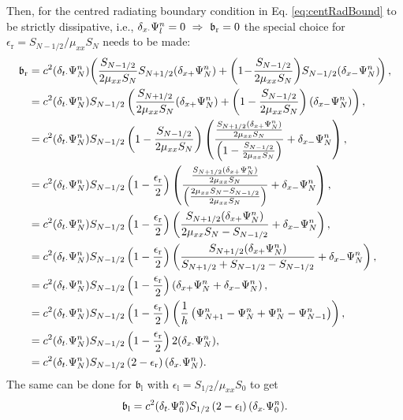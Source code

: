 Then, for the centred radiating boundary condition in Eq. \eqref{eq:centRadBound} to be strictly dissipative, i.e., $\dxd \Psiln = 0 \ \Rightarrow \ \b_\text{r} = 0$ the special choice for $\epsilon_\text{r} = S_{N-1/2} / \mu_{xx}S_N$ needs to be made:
\begin{equation}
    \begin{aligned}
        \mathfrak{b}_\text{r} &= c^2 (\delta_{t\cdot}\Psi_N^n)\!\left(\frac{S_{N-1/2}}{2\mu_{xx}S_N}S_{N+1/2}(\delta_{x+}\Psi_N^n)+\left(1\!-\!\frac{S_{N-1/2}}{2\mu_{xx}S_N}\right)\!S_{N-1/2}(\delta_{x-}\Psi_N^n)\!\right),\\
        &= c^2 (\delta_{t\cdot}\Psi_N^n)S_{N-1/2}\left(\frac{S_{N+1/2}}{2\mu_{xx}S_N}(\delta_{x+}\Psi_N^n)+\left(1-\frac{S_{N-1/2}}{2\mu_{xx}S_N}\right)(\delta_{x-}\Psi_N^n)\right),\\
        &=c^2 (\delta_{t\cdot}\Psi_N^n)S_{N-1/2}\left(1-\frac{S_{N-1/2}}{2\mu_{xx}S_N}\right)\left(\frac{\frac{S_{N+1/2}(\delta_{x+}\Psi_N^n)}{2\mu_{xx}S_N}}{\left(1-\frac{S_{N-1/2}}{2\mu_{xx}S_N}\right)}+\delta_{x-}\Psi_N^n\right),\\
        &=c^2 (\delta_{t\cdot}\Psi_N^n)S_{N-1/2}\left(1-\frac{\epsilon_\text{r}}{2}\right)\left(\frac{\frac{S_{N+1/2}(\delta_{x+}\Psi_N^n)}{2\mu_{xx}S_N}}{\left(\frac{2\mu_{xx}S_N - S_{N-1/2}}{2\mu_{xx}S_N}\right)}+\delta_{x-}\Psi_N^n\right),\\
        &=c^2 (\delta_{t\cdot}\Psi_N^n)S_{N-1/2}\left(1-\frac{\epsilon_\text{r}}{2}\right)\left(\frac{S_{N+1/2}(\delta_{x+}\Psi_N^n)}{2\mu_{xx}S_N - S_{N-1/2}}+\delta_{x-}\Psi_N^n\right),\\
        &=c^2 (\delta_{t\cdot}\Psi_N^n)S_{N-1/2}\left(1-\frac{\epsilon_\text{r}}{2}\right)\left(\frac{S_{N+1/2}(\delta_{x+}\Psi_N^n)}{S_{N+1/2} + S_{N-1/2} - S_{N-1/2}}+\delta_{x-}\Psi_N^n\right),\\
        &=c^2 (\delta_{t\cdot}\Psi_N^n)S_{N-1/2}\left(1-\frac{\epsilon_\text{r}}{2}\right)\left(\delta_{x+}\Psi_N^n+\delta_{x-}\Psi_N^n\right),\\
        &=c^2 (\delta_{t\cdot}\Psi_N^n)S_{N-1/2}\left(1-\frac{\epsilon_\text{r}}{2}\right)\left(\frac{1}{h}\left(\Psi_{N+1}^n - \Psi_N^n + \Psi_N^n - \Psi_{N-1}^n\right)\right),\\
&= c^2 (\delta_{t\cdot}\Psi_N^n)S_{N-1/2}\left(1-\frac{\epsilon_\text{r}}{2}\right)2(\delta_{x\cdot}\Psi_N^n),\\
&= c^2 (\delta_{t\cdot}\Psi_N^n)S_{N-1/2}\left(2-\epsilon_\text{r}\right)(\delta_{x\cdot}\Psi_N^n).
    \end{aligned}
\end{equation}
The same can be done for $\mathfrak{b}_\text{l}$ with $\epsilon_\text{l} = S_{1/2}/\mu_{xx}S_0$ to get
\begin{equation}
    \mathfrak{b}_\text{l} = c^2(\delta_{t\cdot}\Psi_0^n)S_{1/2}\left(2-\epsilon_\text{l}\right)(\delta_{x\cdot}\Psi_0^n).
\end{equation}